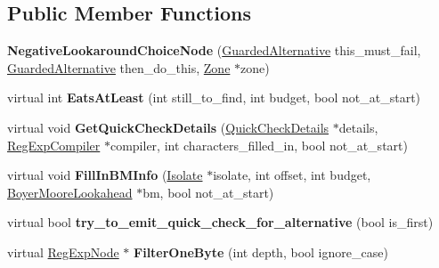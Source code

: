 \subsection*{Public Member Functions}
\begin{DoxyCompactItemize}
\item 
{\bfseries Negative\+Lookaround\+Choice\+Node} (\hyperlink{classv8_1_1internal_1_1_guarded_alternative}{Guarded\+Alternative} this\+\_\+must\+\_\+fail, \hyperlink{classv8_1_1internal_1_1_guarded_alternative}{Guarded\+Alternative} then\+\_\+do\+\_\+this, \hyperlink{classv8_1_1internal_1_1_zone}{Zone} $\ast$zone)\hypertarget{classv8_1_1internal_1_1_negative_lookaround_choice_node_af0c3c86f8e0cd7a812625f1abea993a0}{}\label{classv8_1_1internal_1_1_negative_lookaround_choice_node_af0c3c86f8e0cd7a812625f1abea993a0}

\item 
virtual int {\bfseries Eats\+At\+Least} (int still\+\_\+to\+\_\+find, int budget, bool not\+\_\+at\+\_\+start)\hypertarget{classv8_1_1internal_1_1_negative_lookaround_choice_node_af9a16ac583eccbb0f75d7c4eb9253655}{}\label{classv8_1_1internal_1_1_negative_lookaround_choice_node_af9a16ac583eccbb0f75d7c4eb9253655}

\item 
virtual void {\bfseries Get\+Quick\+Check\+Details} (\hyperlink{classv8_1_1internal_1_1_quick_check_details}{Quick\+Check\+Details} $\ast$details, \hyperlink{classv8_1_1internal_1_1_reg_exp_compiler}{Reg\+Exp\+Compiler} $\ast$compiler, int characters\+\_\+filled\+\_\+in, bool not\+\_\+at\+\_\+start)\hypertarget{classv8_1_1internal_1_1_negative_lookaround_choice_node_a163e2629e6d78fb153e5d97d8a5864b1}{}\label{classv8_1_1internal_1_1_negative_lookaround_choice_node_a163e2629e6d78fb153e5d97d8a5864b1}

\item 
virtual void {\bfseries Fill\+In\+B\+M\+Info} (\hyperlink{classv8_1_1internal_1_1_isolate}{Isolate} $\ast$isolate, int offset, int budget, \hyperlink{classv8_1_1internal_1_1_boyer_moore_lookahead}{Boyer\+Moore\+Lookahead} $\ast$bm, bool not\+\_\+at\+\_\+start)\hypertarget{classv8_1_1internal_1_1_negative_lookaround_choice_node_a12c0b234e3b2d0f73f756d837b84aab7}{}\label{classv8_1_1internal_1_1_negative_lookaround_choice_node_a12c0b234e3b2d0f73f756d837b84aab7}

\item 
virtual bool {\bfseries try\+\_\+to\+\_\+emit\+\_\+quick\+\_\+check\+\_\+for\+\_\+alternative} (bool is\+\_\+first)\hypertarget{classv8_1_1internal_1_1_negative_lookaround_choice_node_a505322e487188ede8532a29af3d5c064}{}\label{classv8_1_1internal_1_1_negative_lookaround_choice_node_a505322e487188ede8532a29af3d5c064}

\item 
virtual \hyperlink{classv8_1_1internal_1_1_reg_exp_node}{Reg\+Exp\+Node} $\ast$ {\bfseries Filter\+One\+Byte} (int depth, bool ignore\+\_\+case)\hypertarget{classv8_1_1internal_1_1_negative_lookaround_choice_node_af4b64d9785a07b851ddfd728fd5e8d57}{}\label{classv8_1_1internal_1_1_negative_lookaround_choice_node_af4b64d9785a07b851ddfd728fd5e8d57}

\end{DoxyCompactItemize}
